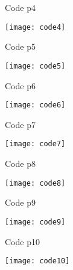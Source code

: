 \documentclass{beamer}
\begin{document}
\begin{frame}{Code p4}
    \begin{minipage}{0.95\textwidth}
        \centering
        \texttt{[image: code4]}
    \end{minipage} 
    
\end{frame}

\begin{frame}{Code p5}
    \begin{minipage}{0.95\textwidth}
        \centering
        \texttt{[image: code5]}
    \end{minipage} 
    
\end{frame}

\begin{frame}{Code p6}
    \begin{minipage}{0.95\textwidth}
        \centering
        \texttt{[image: code6]}
    \end{minipage} 
    
\end{frame}

\begin{frame}{Code p7}
    \begin{minipage}{0.95\textwidth}
        \centering
        \texttt{[image: code7]}
    \end{minipage} 
    
\end{frame}

\begin{frame}{Code p8}
    \begin{minipage}{1.2\textwidth}
        \centering
        \texttt{[image: code8]}
    \end{minipage} 
    
\end{frame}




\begin{frame}{Code p9}
    \begin{minipage}{0.95\textwidth}
        \centering
        \texttt{[image: code9]}
    \end{minipage} 
    
\end{frame}

\begin{frame}{Code p10}
    \begin{minipage}{0.95\textwidth}
        \centering
        \texttt{[image: code10]}
    \end{minipage} 
    
\end{frame}
\end{document}

